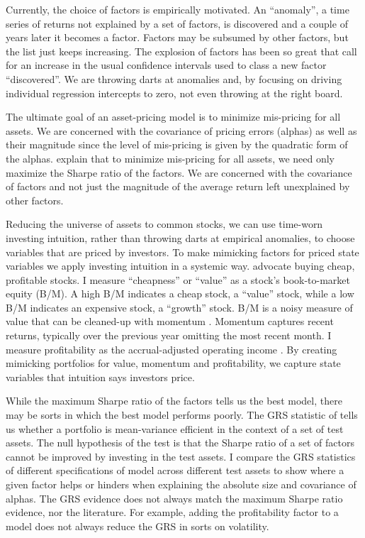 Currently, the choice of factors is empirically motivated. An “anomaly”, a time series of
returns not explained by a set of factors, is discovered and a couple of years later it
becomes a factor. Factors may be subsumed by other factors, but the list just keeps
increasing. The explosion of factors has been so great that \textcite{harvey2016and}
call for an increase in the usual confidence intervals used to class a new factor
“discovered”. We are throwing darts at anomalies and, by focusing on driving individual
regression intercepts to zero, not even throwing at the right board.

The ultimate goal of an asset-pricing model is to minimize mis-pricing for all assets. We
are concerned with the covariance of pricing errors (alphas) as well as their magnitude
since the level of mis-pricing is given by the quadratic form of the alphas.
\textcite{barillas2016alpha} explain that to minimize mis-pricing for all assets, we need
only maximize the Sharpe ratio of the factors. We are concerned with the covariance of
factors and not just the magnitude of the average return left unexplained by other
factors.

Reducing the universe of assets to common stocks, we can use time-worn investing
intuition, rather than throwing darts at empirical anomalies, to choose variables that are
priced by investors. To make mimicking factors for priced state variables we apply
investing intuition in a systemic way. \textcite{graham1934security} advocate buying
cheap, profitable stocks. I measure “cheapness” or “value” as a stock’s book-to-market
equity (B/M). A high B/M indicates a cheap stock, a “value” stock, while a low B/M
indicates an expensive stock, a “growth” stock. B/M is a noisy measure of value that can
be cleaned-up with momentum \parencite{kok2017facts, asness2013devil}. Momentum captures
recent returns, typically over the previous year omitting the most recent month. I measure
profitability as the accrual-adjusted operating income \parencite{ball2016accruals}. By
creating mimicking portfolios for value, momentum and profitability, we capture state
variables that intuition says investors price.

While the maximum Sharpe ratio of the factors tells us the best model, there may be sorts
in which the best model performs poorly. The GRS statistic of \textcite{gibbons1989test}
tells us whether a portfolio is mean-variance efficient in the context of a set of test
assets. The null hypothesis of the test is that the Sharpe ratio of a set of factors
cannot be improved by investing in the test assets. I compare the GRS statistics of
different specifications of model across different test assets to show where a given
factor helps or hinders when explaining the absolute size and covariance of alphas. The
GRS evidence does not always match the maximum Sharpe ratio evidence, nor the literature.
For example, adding the profitability factor to a model does not always reduce the GRS in
sorts on volatility.

